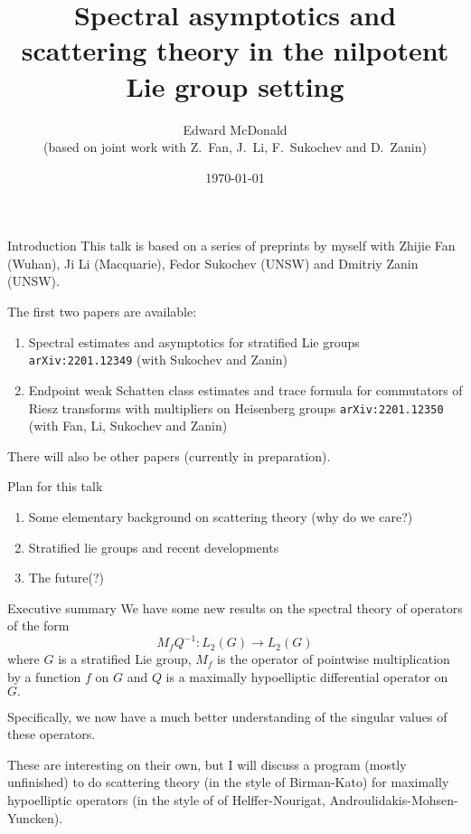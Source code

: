 \documentclass{beamer}
\date{\today}
\newcommand\makebeamertitle{\frame{\maketitle}}%
\numberwithin{equation}{section}
\theoremstyle{plain}
\theoremstyle{plain}
\theoremstyle{definition}
\theoremstyle{plain}
\theoremstyle{plain}
\theoremstyle{definition}
\begin{document}
\title[Spectral asymptotics and nilpotent Lie groups]{Spectral asymptotics and scattering theory in the nilpotent Lie group setting}


\author[E. McDonald]{Edward McDonald\\
(based on joint work with  Z.~Fan, J.~Li, F.~Sukochev and D.~Zanin)}



\makebeamertitle

\begin{frame}{Introduction}
    This talk is based on a series of preprints by myself with Zhijie Fan (Wuhan), Ji Li (Macquarie), Fedor Sukochev (UNSW) and Dmitriy Zanin (UNSW). 
    
    The first two papers are available:
    \begin{enumerate}[{\rm (a)}]
      \item{} Spectral estimates and asymptotics for stratified Lie groups \texttt{arXiv:2201.12349} (with Sukochev and Zanin)
      \item{} Endpoint weak Schatten class estimates and trace formula for commutators of Riesz transforms with multipliers on Heisenberg groups \texttt{arXiv:2201.12350} (with Fan, Li, Sukochev and Zanin) 
    \end{enumerate}
    There will also be other papers (currently in preparation).
\end{frame}

\begin{frame}{Plan for this talk}
    \begin{enumerate}
        \item{} Some elementary background on scattering theory (why do we care?)
        \item{} Stratified lie groups and recent developments
        \item{} The future(?)
    \end{enumerate}
\end{frame}

\begin{frame}{Executive summary}
  We have some new results on the spectral theory of operators of the form
  \[
    M_f Q^{-1}:L_2(G)\to L_2(G)
  \]
  where $G$ is a stratified Lie group, $M_f$ is the operator of pointwise multiplication by a function $f$ on $G$ and $Q$ is a maximally hypoelliptic differential operator on $G.$

  Specifically, we now have a much better understanding of the singular values of these operators.
  \pause

  These are interesting on their own, but I will discuss a program (mostly unfinished) to do scattering theory (in the style of Birman-Kato) for maximally hypoelliptic operators (in the style of of Helffer-Nourigat, Androulidakis-Mohsen-Yuncken).
\end{frame}
\end{document}
